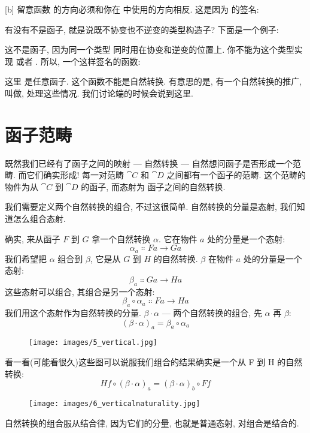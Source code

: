 [b]
留意函数  的方向必须和你在  中使用的方向相反. 这是因为  的签名:

有没有不是函子, 就是说既不协变也不逆变的类型构造子? 下面是一个例子:

这不是函子, 因为同一个类型  同时用在协变和逆变的位置上. 你不能为这个类型实现  或者
. 所以, 一个这样签名的函数:

这里  是任意函子. 这个函数不能是自然转换. 有意思的是, 有一个自然转换的推广, 叫做, 处理这些情况. 我们讨论端的时候会说到这里.

\section{函子范畴}

既然我们已经有了函子之间的映射 --- 自然转换 --- 自然想问函子是否形成一个范畴. 而它们确实形成! 每一对范畴
$\cat{C}$ 和 $\cat{D}$ 之间都有一个函子的范畴. 这个范畴的物件为从 $\cat{C}$ 到 $\cat{D}$ 的函子, 而态射为
函子之间的自然转换.

我们需要定义两个自然转换的组合, 不过这很简单. 自然转换的分量是态射, 我们知道怎么组合态射.

确实, 来从函子 $F$ 到 $G$ 拿一个自然转换 $\alpha$. 它在物件 $a$ 处的分量是一个态射:
\[\alpha_a \Colon F a \to G a\]
我们希望把 $\alpha$ 组合到 $\beta$, 它是从 $G$ 到 $H$ 的自然转换. $\beta$ 在物件 $a$ 处的分量是一个态射:
\[\beta_a \Colon G a \to H a\]
这些态射可以组合, 其组合是另一个态射:
\[\beta_a \circ \alpha_a \Colon F a \to H a\]
我们用这个态射作为自然转换的分量.
$\beta \cdot \alpha$ --- 两个自然转换的组合, 先 $\alpha$ 再 $\beta$:
\[(\beta \cdot \alpha)_a = \beta_a \circ \alpha_a\]

\begin{figure}[H]
  \centering
  \texttt{[image: images/5\_vertical.jpg]}
\end{figure}

\noindent
看一看(可能看很久)这些图可以说服我们组合的结果确实是一个从 F 到 H 的自然转换:
\[H f \circ (\beta \cdot \alpha)_a = (\beta \cdot \alpha)_b \circ F f\]

\begin{figure}[H]
  \centering
  \texttt{[image: images/6\_verticalnaturality.jpg]}
\end{figure}

\noindent
自然转换的组合服从结合律, 因为它们的分量, 也就是普通态射, 对组合是结合的.

